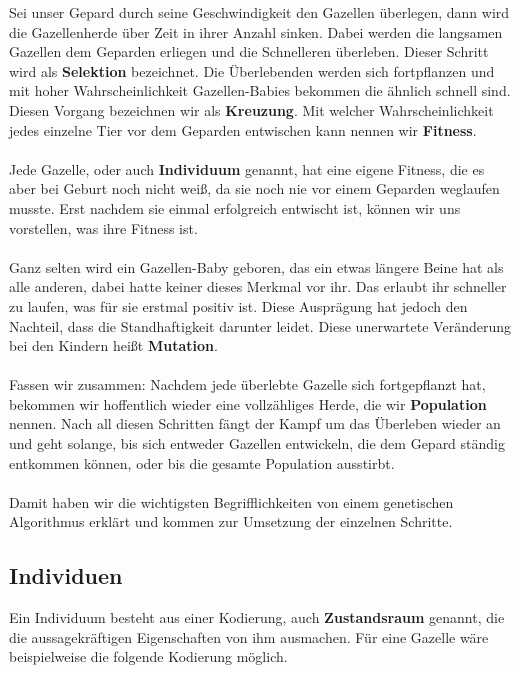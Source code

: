         \noindent
        Sei unser Gepard durch seine Geschwindigkeit den Gazellen überlegen, dann wird die Gazellenherde über Zeit in ihrer Anzahl sinken. Dabei werden die langsamen Gazellen dem Geparden erliegen und die Schnelleren überleben. Dieser Schritt wird als \textbf{Selektion} bezeichnet. Die Überlebenden werden sich fortpflanzen und mit hoher Wahrscheinlichkeit Gazellen-Babies bekommen die ähnlich schnell sind. Diesen Vorgang bezeichnen wir als \textbf{Kreuzung}. Mit welcher Wahrscheinlichkeit jedes einzelne Tier vor dem Geparden entwischen kann nennen wir \textbf{Fitness}.\\
        \\
        Jede Gazelle, oder auch \textbf{Individuum} genannt, hat eine eigene Fitness, die es aber bei Geburt noch nicht weiß, da sie noch nie vor einem Geparden weglaufen musste. Erst nachdem sie einmal erfolgreich entwischt ist, können wir uns vorstellen, was ihre Fitness ist.\\
        \\
        Ganz selten wird ein Gazellen-Baby geboren, das ein etwas längere Beine hat als alle anderen, dabei hatte keiner dieses Merkmal vor ihr. Das erlaubt ihr schneller zu laufen, was für sie erstmal positiv ist. Diese Ausprägung hat jedoch den Nachteil, dass die Standhaftigkeit darunter leidet. Diese unerwartete Veränderung bei den Kindern heißt \textbf{Mutation}.\\
        \\
        Fassen wir zusammen: Nachdem jede überlebte Gazelle sich fortgepflanzt hat, bekommen wir hoffentlich wieder eine vollzähliges Herde, die wir \textbf{Population} nennen. Nach all diesen Schritten fängt der Kampf um das Überleben wieder an und geht solange, bis sich entweder Gazellen entwickeln, die dem Gepard ständig entkommen können, oder bis die gesamte Population ausstirbt.\\
        \\
        Damit haben wir die wichtigsten Begrifflichkeiten von einem genetischen Algorithmus erklärt und kommen zur Umsetzung der einzelnen Schritte.

        \subsection{Individuen}

            Ein Individuum besteht aus einer Kodierung, auch \textbf{Zustandsraum} genannt, die die aussagekräftigen Eigenschaften von ihm ausmachen. Für eine Gazelle wäre beispielweise die folgende Kodierung möglich.

